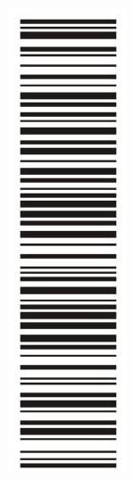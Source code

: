 \documentclass[10pt]{article}
\begin{document}
\begin{enumerate}
\includegraphics[max width=\textwidth, center]{2024_11_21_ad52a81220b9b2239458g-01(2)}
\end{enumerate}
\end{document}

